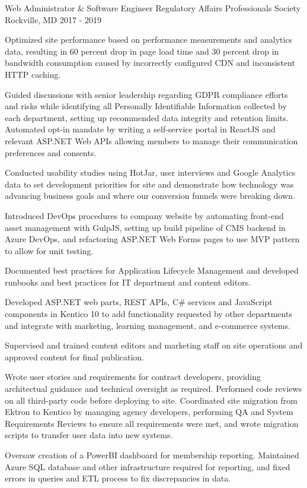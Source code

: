 \begin{cventries}
  \cventry
    {Web Administrator \& Software Engineer} %
    {Regulatory Affairs Professionals Society} %
    {Rockville, MD} %
    {2017 - 2019} %
    {
      \begin{cvitems} %
        \item {Optimized site performance based on performance measurements and analytics data, resulting in 60 percent drop in page load time and 30 percent drop in bandwidth consumption caused by incorrectly configured CDN and inconsistent HTTP caching.}
        \item {Guided discussions with senior leadership regarding GDPR compliance efforts and risks while identifying all Personally Identifiable Information collected by each department, setting up recommended data integrity and retention limits. Automated opt-in mandate by writing a self-service portal in ReactJS and relevant ASP.NET Web APIs allowing members to manage their communication preferences and consents.}
        \item {Conducted usability studies using HotJar, user interviews and Google Analytics data to set development priorities for site and demonstrate how technology was advancing business goals and where our conversion funnels were breaking down.}
        \item {Introduced DevOps procedures to company website by automating front-end asset management with GulpJS, setting up build pipeline of CMS backend in Azure DevOps, and refactoring ASP.NET Web Forms pages to use MVP pattern to allow for unit testing.}
         \item {Documented best practices for Application Lifecycle Management and developed runbooks and best practices for IT department and content editors.}
         \item {Developed ASP.NET web parts, REST APIs, C# services and JavaScript components in Kentico 10 to add functionality requested by other departments and integrate with marketing, learning management, and e-commerce systems.}
        \item {Supervised and trained content editors and marketing staff on site operations and approved content for final publication.}
        \item {Wrote user stories and requirements for contract developers, providing architectual guidance and technical oversight as required. Performed code reviews on all third-party code before deploying to site. Coordinated site migration from Ektron to Kentico by managing agency developers, performing QA and System Requirements Reviews to ensure all requirements were met, and wrote migration scripts to transfer user data into new systems.}
        \item {Oversaw creation of a PowerBI dashboard for membership reporting. Maintained Azure SQL database and other infrastructure required for reporting, and fixed errors in queries and ETL process to fix discrepancies in data.}
      \end{cvitems}
    }


\end{cventries}
